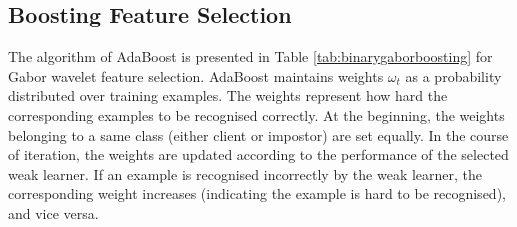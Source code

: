 \documentclass[a4paper,10pt]{article}
\begin{document}
\subsection{Boosting Feature Selection}
The algorithm of AdaBoost is presented in \mbox{Table} \ref{tab:binarygaborboosting} for Gabor wavelet feature selection. AdaBoost maintains weights $\omega_{t}$ as a probability distributed over training examples. The weights represent how hard the corresponding examples to be recognised correctly. At the beginning, the weights belonging to a same class (either client or impostor) are set equally. In the course of iteration, the weights are updated according to the performance of the selected weak learner. If an example is recognised incorrectly by the weak learner, the corresponding weight increases (indicating the example is hard to be recognised), and vice versa.
\end{document}
